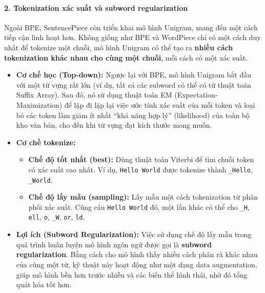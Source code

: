 \paragraph{2. Tokenization xác suất và subword regularization}
Ngoài BPE, SentencePiece còn triển khai mô hình Unigram, mang đến một cách tiếp cận linh hoạt hơn. Không giống như BPE và WordPiece chỉ có một cách duy nhất để tokenize một chuỗi, mô hình Unigram có thể tạo ra \textbf{nhiều cách tokenization khác nhau cho cùng một chuỗi}, mỗi cách có một xác suất.

\begin{itemize}
    \item \textbf{Cơ chế học (Top-down):} Ngược lại với BPE, mô hình Unigram bắt đầu với một từ vựng rất lớn (ví dụ, tất cả các subword có thể có từ thuật toán Suffix Array). Sau đó, nó sử dụng thuật toán EM (Expectation-Maximization) để lặp đi lặp lại việc ước tính xác suất của mỗi token và loại bỏ các token làm giảm ít nhất “khả năng hợp lý” (likelihood) của toàn bộ kho văn bản, cho đến khi từ vựng đạt kích thước mong muốn.
    
    \item \textbf{Cơ chế tokenize:}
        \begin{itemize}
            \item \textbf{Chế độ tốt nhất (best):} Dùng thuật toán Viterbi để tìm chuỗi token có xác suất cao nhất. Ví dụ, \texttt{Hello World} được tokenize thành \texttt{\_Hello}, \texttt{\_World}.
            \item \textbf{Chế độ lấy mẫu (sampling):} Lấy mẫu một cách tokenization từ phân phối xác suất. Cũng câu \texttt{Hello World} đó, một lần khác có thể cho \texttt{\_H}, \texttt{ell}, \texttt{o}, \texttt{\_W}, \texttt{or}, \texttt{ld}.
        \end{itemize}
    
    \item \textbf{Lợi ích (Subword Regularization):} Việc sử dụng chế độ lấy mẫu trong quá trình huấn luyện mô hình ngôn ngữ được gọi là \textbf{subword regularization}. Bằng cách cho mô hình thấy nhiều cách phân rã khác nhau của cùng một từ, kỹ thuật này hoạt động như một dạng data augmentation, giúp mô hình bền hơn trước nhiễu và các biến thể hình thái, nhờ đó tổng quát hóa tốt hơn.
\end{itemize}

